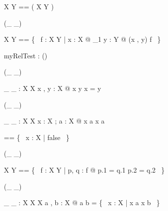 \begin{zed}
X \rel Y == \power ( X \cross Y )
\end{zed}

\begin{zed}
 \rightassoc (\_ \fun \_)
\end{zed}

\begin{zed}
 X \fun Y == \{~ f : X \rel Y | \forall x : X @ \exists_1 y : Y @ (x , y) \in f ~\}
\end{zed}


\begin{axdef}
  myRelTest : \nat \fun \power (\nat \fun \nat)
\end{axdef}

\begin{zed}
\relation (\_ \neq \_)
\end{zed}

\begin{gendef}[X]
\_ \neq \_ : X \rel X
\where
\forall x , y : X @ x \neq y \iff \lnot x = y
\end{gendef}

\begin{zed}
\relation (\_ \notin \_)
\end{zed}

\begin{gendef}[X]
\_ \notin \_ : X \rel \power X
\where
\forall x : X ; a : \power X @ x \notin a \iff \lnot x \in a
\end{gendef}

\begin{zed}
\emptyset [ X ] == \{~ x : X | false ~\}
\end{zed}

\begin{zed}
 \rightassoc (\_ \pinj \_)
\end{zed}

\begin{zed}
X \pinj Y == \{~ f : X \rel Y | \forall p, q : f @ p.1 = q.1 \iff p.2 = q.2 ~\}
\end{zed}

\begin{zed}
 \leftassoc (\_ \cap \_)
\end{zed}

\begin{gendef}[X]
\_ \cap \_ : \power X \cross \power X \fun \power X
\where
\forall a , b : \power X @ a \cap b = \{~ x : X | x \in a \land x \in b 
~\}
\end{gendef}

